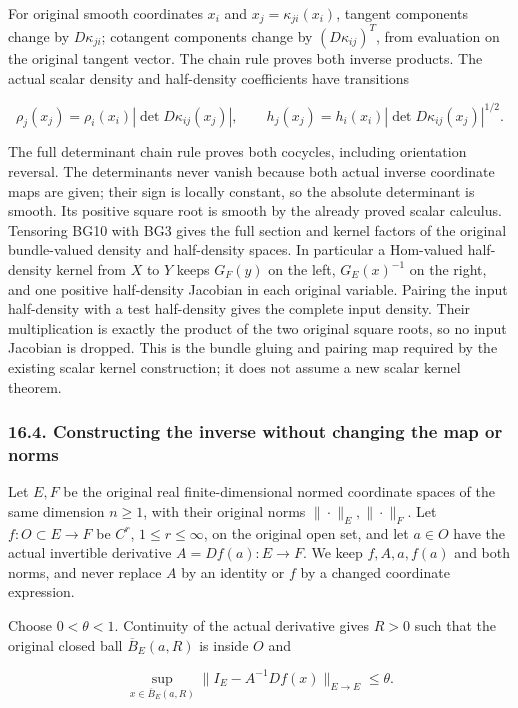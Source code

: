 \documentclass[
  11pt,
]{article}
\begin{document}
For original smooth coordinates \(x_i\) and \(x_j=\kappa_{ji}(x_i)\),
tangent components change by \(D\kappa_{ji}\); cotangent components
change by \((D\kappa_{ij})^T\), from evaluation on the original tangent
vector. The chain rule proves both inverse products. The actual scalar
density and half-density coefficients have transitions

\[
 \rho_j(x_j)=\rho_i(x_i)|\det D\kappa_{ij}(x_j)|,\qquad
 h_j(x_j)=h_i(x_i)|\det D\kappa_{ij}(x_j)|^{1/2}.
 \tag{BG10}
\]

The full determinant chain rule proves both cocycles, including
orientation reversal. The determinants never vanish because both actual
inverse coordinate maps are given; their sign is locally constant, so
the absolute determinant is smooth. Its positive square root is smooth
by the already proved scalar calculus. Tensoring BG10 with BG3 gives the
full section and kernel factors of the original bundle-valued density
and half-density spaces. In particular a Hom-valued half-density kernel
from \(X\) to \(Y\) keeps \(G_F(y)\) on the left, \(G_E(x)^{-1}\) on the
right, and one positive half-density Jacobian in each original variable.
Pairing the input half-density with a test half-density gives the
complete input density. Their multiplication is exactly the product of
the two original square roots, so no input Jacobian is dropped. This is
the bundle gluing and pairing map required by the existing scalar kernel
construction; it does not assume a new scalar kernel theorem.

\subsubsection{16.4. Constructing the inverse without changing the map
or
norms}\label{constructing-the-inverse-without-changing-the-map-or-norms}

Let \(E,F\) be the original real finite-dimensional normed coordinate
spaces of the same dimension \(n\geq1\), with their original norms
\(\|\cdot\|_E,\|\cdot\|_F\). Let \(f:O\subset E\to F\) be \(C^r\),
\(1\leq r\leq\infty\), on the original open set, and let \(a\in O\) have
the actual invertible derivative \(A=Df(a):E\to F\). We keep
\(f,A,a,f(a)\) and both norms, and never replace \(A\) by an identity or
\(f\) by a changed coordinate expression.

Choose \(0<\theta<1\). Continuity of the actual derivative gives \(R>0\)
such that the original closed ball \(\overline B_E(a,R)\) is inside
\(O\) and

\[
 \sup_{x\in\overline B_E(a,R)}
       \|I_E-A^{-1}Df(x)\|_{E\to E}\leq\theta .
 \tag{IV1}
\]
\end{document}
